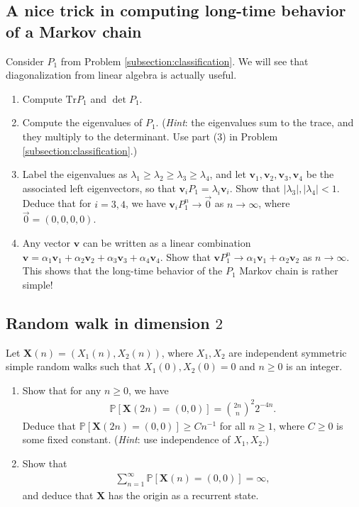 \documentclass[12pt,reqno]{amsart}
\theoremstyle{definition}
\theoremstyle{remark}
\numberwithin{equation}{section}
\begin{document}
\subsection{A nice trick in computing long-time behavior of a Markov chain}
Consider $P_{1}$ from Problem \ref{subsection:classification}. We will see that diagonalization from linear algebra is actually useful.
\begin{enumerate}
\item Compute $\mathrm{Tr} P_{1}$ and $\det P_{1}$.
\item Compute the eigenvalues of $P_{1}$. (\emph{Hint}: the eigenvalues sum to the trace, and they multiply to the determinant. Use part (3) in Problem \ref{subsection:classification}.) 
\item Label the eigenvalues as $\lambda_{1}\geq\lambda_{2}\geq\lambda_{3}\geq\lambda_{4}$, and let $\mathbf{v}_{1},\mathbf{v}_{2},\mathbf{v}_{3},\mathbf{v}_{4}$ be the associated left eigenvectors, so that $\mathbf{v}_{i}P_{1}=\lambda_{i}\mathbf{v}_{i}$. Show that $|\lambda_{3}|,|\lambda_{4}|<1$. Deduce that for $i=3,4$, we have $\mathbf{v}_{i}P_{1}^{n}\to\vec{0}$ as $n\to\infty$, where $\vec{0}=(0,0,0,0)$.
\item Any vector $\mathbf{v}$ can be written as a linear combination $\mathbf{v}=\alpha_{1}\mathbf{v}_{1}+\alpha_{2}\mathbf{v}_{2}+\alpha_{3}\mathbf{v}_{3}+\alpha_{4}\mathbf{v}_{4}$. Show that $\mathbf{v}P_{1}^{n}\to\alpha_{1}\mathbf{v}_{1}+\alpha_{2}\mathbf{v}_{2}$ as $n\to\infty$. This shows that the long-time behavior of the $P_{1}$ Markov chain is rather simple! 
\end{enumerate}
\subsection{Random walk in dimension $2$}
Let $\mathbf{X}(n)=(X_{1}(n),X_{2}(n))$, where $X_{1},X_{2}$ are independent symmetric simple random walks such that $X_{1}(0),X_{2}(0)=0$ and $n\geq0$ is an integer. 
\begin{enumerate}
\item Show that for any $n\geq0$, we have 
%
\begin{align*}
\mathbb{P}[\mathbf{X}(2n)=(0,0)]=\binom{2n}{n}^{2}2^{-4n}.
\end{align*}
%
Deduce that $\mathbb{P}[\mathbf{X}(2n)=(0,0)]\geq Cn^{-1}$ for all $n\geq1$, where $C\geq0$ is some fixed constant. (\emph{Hint}: use independence of $X_{1},X_{2}$.)
\item Show that 
%
\begin{align*}
\sum_{n=1}^{\infty}\mathbb{P}[\mathbf{X}(n)=(0,0)]=\infty,
\end{align*}
%
and deduce that $\mathbf{X}$ has the origin as a recurrent state.
\end{enumerate}
\end{document}
